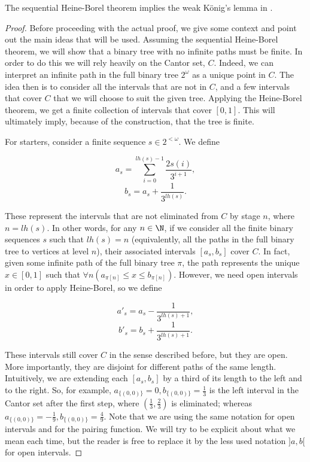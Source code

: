 \documentclass[../main.tex]{memoir}
\begin{document}
\begin{theorem}
  The sequential Heine-Borel theorem implies the weak König's lemma in \rca.
\end{theorem}
\begin{proof}
  Before proceeding with the actual proof, we give some context and point out the main ideas that will be used. Assuming the sequential Heine-Borel theorem, we will show that a binary tree with no infinite paths must be finite. In order to do this we will rely heavily on the Cantor set, $C$. Indeed, we can interpret an infinite path in the full binary tree $2^{\omega}$ as a unique point in $C$. The idea then is to consider all the intervals that are not in $C$, and a few intervals that cover $C$ that we will choose to suit the given tree. Applying the Heine-Borel theorem, we get a finite collection of intervals that cover $[0, 1]$. This will ultimately imply, because of the construction, that the tree is finite.

  For starters, consider a finite sequence $s \in 2^{<\omega}$. We define

  \[ a_s = \sum_{i = 0}^{lh(s) - 1} \frac{2s(i)}{3^{i + 1}}, \]
  \[ b_s = a_s + \frac{1}{3^{lh(s)}}. \]

  These represent the intervals that are not eliminated from $C$ by stage $n$, where $n = lh(s)$. In other words, for any $n \in \N$, if we consider all the finite binary sequences $s$ such that $lh(s) = n$ (equivalently, all the paths in the full binary tree to vertices at level $n$), their associated intervals $[a_s, b_s]$ cover $C$. In fact, given some infinite path of the full binary tree $\pi$, the path represents the unique $x \in [0, 1]$ such that $\forall n (a_{\pi[n]} \le x \le b_{\pi[n]})$. However, we need open intervals in order to apply Heine-Borel, so we define

  \[ a'_s = a_s - \frac{1}{3^{lh(s) + 1}}, \]
  \[ b'_s = b_s + \frac{1}{3^{lh(s) + 1}}. \]

  These intervals still cover $C$ in the sense described before, but they are open. More importantly, they are disjoint for different paths of the same length. Intuitively, we are extending each $[a_s, b_s]$ by a third of its length to the left and to the right. So, for example, $a_{\{(0, 0)\}} = 0, b_{\{(0, 0)\}} = \frac13$ is the left interval in the Cantor set after the first step, where $(\frac13, \frac23)$ is eliminated; whereas $a_{\{(0, 0)\}} = -\frac19, b_{\{(0, 0)\}} = \frac49$. Note that we are using the same notation for open intervals and for the pairing function. We will try to be explicit about what we mean each time, but the reader is free to replace it by the less used notation $]a, b[$ for open intervals.


\end{proof}
\end{document}

